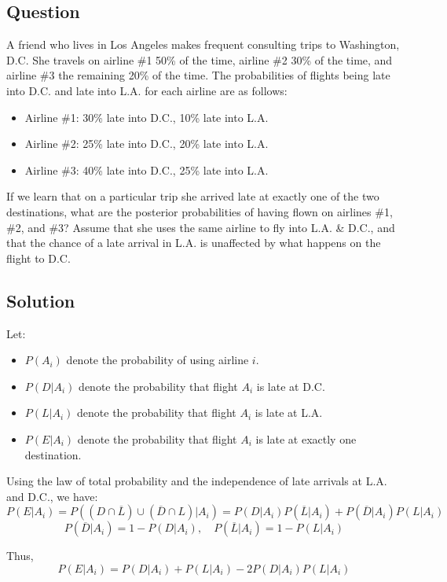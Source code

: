\documentclass{article}
\begin{document}
\subsection*{Question}
A friend who lives in Los Angeles makes frequent consulting trips to Washington, D.C. She travels on airline \#1 50\% of the time, airline \#2 30\% of the time, and airline \#3 the remaining 20\% of the time. The probabilities of flights being late into D.C. and late into L.A. for each airline are as follows:
\begin{itemize}
    \item Airline \#1: 30\% late into D.C., 10\% late into L.A.
    \item Airline \#2: 25\% late into D.C., 20\% late into L.A.
    \item Airline \#3: 40\% late into D.C., 25\% late into L.A.
\end{itemize}

If we learn that on a particular trip she arrived late at exactly one of the two destinations, what are the posterior probabilities of having flown on airlines \#1, \#2, and \#3? Assume that she uses the same airline to fly into L.A. \& D.C., and that the chance of a late arrival in L.A. is unaffected by what happens on the flight to D.C.

\subsection*{Solution}
Let:
\begin{itemize}
    \item $P(A_i)$ denote the probability of using airline $i$.
    \item $P(D|A_i)$ denote the probability that flight $A_i$ is late at D.C.
    \item $P(L|A_i)$ denote the probability that flight $A_i$ is late at L.A.
    \item $P(E|A_i)$ denote the probability that flight $A_i$ is late at exactly one destination.
\end{itemize}

Using the law of total probability and the independence of late arrivals at L.A. and D.C., we have:
\[
P(E|A_i) = P((D \cap \overline{L}) \cup (\overline{D} \cap L) | A_i) = P(D|A_i)P(\overline{L}|A_i) + P(\overline{D}|A_i)P(L|A_i)
\]
\[
P(\overline{D}|A_i) = 1 - P(D|A_i), \quad P(\overline{L}|A_i) = 1 - P(L|A_i)
\]

Thus,
\[
P(E|A_i) = P(D|A_i) + P(L|A_i) - 2P(D|A_i)P(L|A_i)
\]
\end{document}
